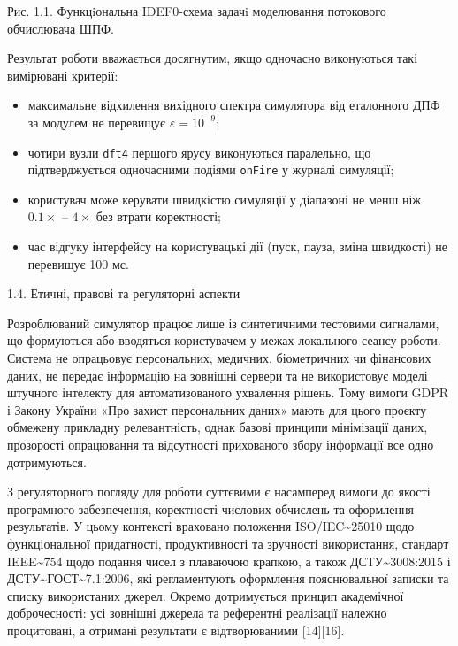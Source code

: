 \documentclass[
]{article}
\newcommand{\passthrough}[1]{#1}
\begin{document}


Рис. 1.1. Функцiональна IDEF0-схема задачi моделювання потокового
обчислювача ШПФ.

Результат роботи вважається досягнутим, якщо одночасно виконуються такі
вимірювані критерії:

\begin{itemize}
\item
  максимальне відхилення вихідного спектра симулятора від еталонного ДПФ
  за модулем не перевищує \(\varepsilon = 10^{- 9}\);
\item
  чотири вузли \passthrough{\lstinline!dft!}\passthrough{\lstinline!4!}
  першого ярусу виконуються паралельно, що підтверджується одночасними
  подіями \passthrough{\lstinline!onFire!} у журналі симуляції;
\item
  користувач може керувати швидкістю симуляції у діапазоні не менш ніж
  \(0.1 \times\) -- \(4 \times\) без втрати коректності;
\item
  час відгуку інтерфейсу на користувацькі дії (пуск, пауза, зміна
  швидкості) не перевищує 100 мс.
\end{itemize}

\protect{}\label{Xb0eb9a98447834cee65aa9c07744072b382be46}{}1.4.
Етичні, правові та регуляторні аспекти

Розроблюваний симулятор працює лише із синтетичними тестовими сигналами,
що формуються або вводяться користувачем у межах локального сеансу
роботи. Система не опрацьовує персональних, медичних, біометричних чи
фінансових даних, не передає інформацію на зовнішні сервери та не
використовує моделі штучного інтелекту для автоматизованого ухвалення
рішень. Тому вимоги GDPR і Закону України «Про захист персональних
даних» мають для цього проєкту обмежену прикладну релевантність, однак
базові принципи мінімізації даних, прозорості опрацювання та відсутності
прихованого збору інформації все одно дотримуються.

З регуляторного погляду для роботи суттєвими є насамперед вимоги до
якості програмного забезпечення, коректності числових обчислень та
оформлення результатів. У цьому контексті враховано положення
ISO/IEC\textasciitilde25010 щодо функціональної придатності,
продуктивності та зручності використання, стандарт
IEEE\textasciitilde754 щодо подання чисел з плаваючою крапкою, а також
ДСТУ\textasciitilde3008:2015 і
ДСТУ\textasciitilde ГОСТ\textasciitilde7.1:2006, які регламентують
оформлення пояснювальної записки та списку використаних джерел. Окремо
дотримується принцип академічної доброчесності: усі зовнішні джерела та
референтні реалізації належно процитовані, а отримані результати є
відтворюваними {[}14{]}{[}16{]}.
\end{document}
